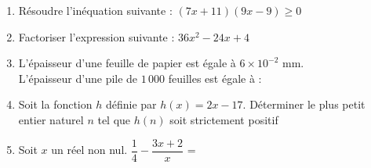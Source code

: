 \documentclass[a4paper,11pt]{article}
\begin{document}
\begin{seance}{} %

\begin{enumerate}
\item Résoudre l'inéquation suivante : $(7x+11)(9x-9)\geqslant0$ \dotfill

\dotfill

\dotfill

\dotfill

\item Factoriser l'expression suivante : $36x^2-24x+4$ \dotfill

\item L'épaisseur d'une feuille de papier est égale à $6 \times 10^{-2}$ mm. \\
 L'épaisseur d'une pile de $1\,000$ feuilles est égale à : \dotfill
 
 \dotfill

\item Soit la fonction $h$ définie par $h(x)=2x-17$. Déterminer le plus petit entier naturel $n$ tel que $h(n)$ soit strictement positif \dotfill

\dotfill

\dotfill

\item Soit $x$ un réel non nul. $\dfrac{1}{4}-\dfrac{3x+2}{x}$ = \dotfill

\dotfill

\dotfill

\end{enumerate}

\end{seance}
\end{document}
